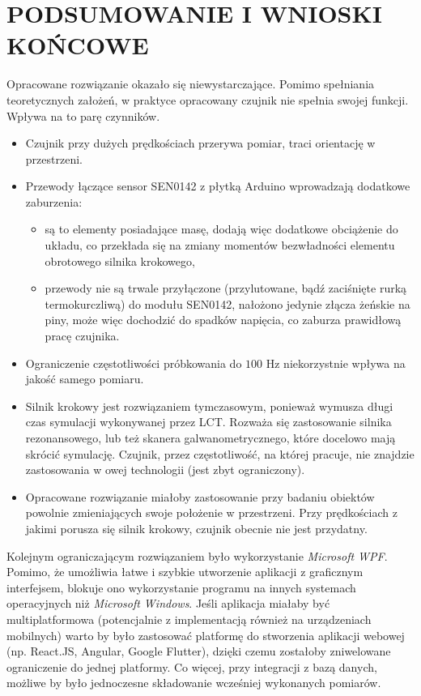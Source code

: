 \chapter{PODSUMOWANIE I WNIOSKI KOŃCOWE}

Opracowane rozwiązanie okazało się niewystarczające. Pomimo spełniania teoretycznych założeń, w praktyce opracowany czujnik nie spełnia swojej funkcji. Wpływa na to parę czynników.

\begin{itemize}
    \item Czujnik przy dużych prędkościach przerywa pomiar, traci orientację w przestrzeni.
    \item Przewody łączące sensor SEN0142 z płytką Arduino wprowadzają dodatkowe zaburzenia:
    \begin{itemize}
        \item są to elementy posiadające masę, dodają więc dodatkowe obciążenie do układu, co przekłada się na zmiany momentów bezwładności elementu obrotowego silnika krokowego,
        \item przewody nie są trwale przyłączone (przylutowane, bądź zaciśnięte rurką termokurczliwą) do modułu SEN0142, nałożono jedynie złącza żeńskie na piny, może więc dochodzić do spadków napięcia, co zaburza prawidłową pracę czujnika.
    \end{itemize}
    \item Ograniczenie częstotliwości próbkowania do $100$ Hz niekorzystnie wpływa na jakość samego pomiaru.
    \item Silnik krokowy jest rozwiązaniem tymczasowym, ponieważ wymusza długi czas symulacji wykonywanej przez LCT. Rozważa się zastosowanie silnika rezonansowego, lub też skanera galwanometrycznego, które docelowo mają skrócić symulację. Czujnik, przez częstotliwość, na której pracuje, nie znajdzie zastosowania w owej technologii (jest zbyt ograniczony).
    \item Opracowane rozwiązanie miałoby zastosowanie przy badaniu obiektów powolnie zmieniających swoje położenie w przestrzeni. Przy prędkościach z jakimi porusza się silnik krokowy, czujnik obecnie nie jest przydatny.
\end{itemize}

Kolejnym ograniczającym rozwiązaniem było wykorzystanie \emph{Microsoft WPF}. Pomimo, że umożliwia łatwe i szybkie utworzenie aplikacji z graficznym interfejsem, blokuje ono wykorzystanie programu na innych systemach operacyjnych niż \emph{Microsoft Windows}. Jeśli aplikacja miałaby być multiplatformowa (potencjalnie z implementacją również na urządzeniach mobilnych) warto by było zastosować platformę do stworzenia aplikacji webowej (np. React.JS, Angular, Google Flutter), dzięki czemu zostałoby zniwelowane ograniczenie do jednej platformy. Co więcej, przy integracji z bazą danych, możliwe by było jednoczesne składowanie wcześniej wykonanych pomiarów.

